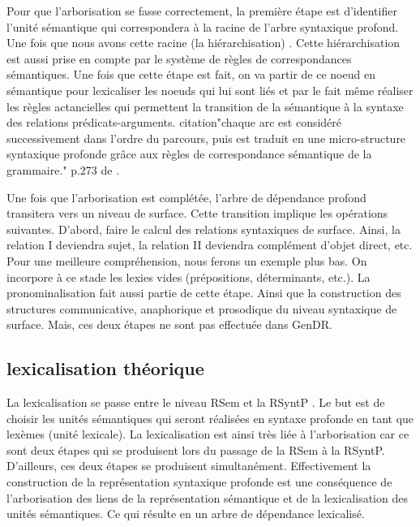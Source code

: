 Pour que l'arborisation se fasse correctement, la première étape est d'identifier l'unité sémantique qui correspondera à la racine de l'arbre syntaxique profond. Une fois que nous avons cette racine (la hiérarchisation) \citep{PolguereStructurationmisejeu1990}. Cette hiérarchisation est aussi prise en compte par le système de règles de correspondances sémantiques. Une fois que cette étape est fait, on va partir de ce noeud en sémantique pour lexicaliser les noeuds qui lui sont liés et par le fait même réaliser les règles actancielles qui permettent la transition de la sémantique à la syntaxe des relations prédicats-arguments. citation"chaque arc est considéré successivement dans l'ordre du parcours, puis est traduit en une micro-structure syntaxique profonde grâce aux règles de correspondance sémantique de la grammaire." p.273 de \citep{PolguereStructurationmisejeu1990}. 



Une fois que l'arborisation est complétée, l'arbre de dépendance profond transitera vers un niveau de surface. Cette transition implique les opérations suivantes. D'abord, faire le calcul des relations syntaxiques de surface. Ainsi, la relation I deviendra sujet, la relation II deviendra complément d'objet direct, etc. Pour une meilleure compréhension, nous ferons un exemple plus bas. On incorpore à ce stade les lexies vides (prépositions, déterminants, etc.). La pronominalisation fait aussi partie de cette étape. Ainsi que la construction des structures communicative, anaphorique et prosodique du niveau syntaxique de surface. Mais, ces deux étapes ne sont pas effectuée dans GenDR.

\subsection{lexicalisation théorique}

La lexicalisation se passe entre le niveau RSem et la RSyntP \citep{PolguereStructurationmisejeu1990}. Le but est de choisir les unités sémantiques qui seront réalisées en syntaxe profonde en tant que lexèmes (unité lexicale). La lexicalisation est ainsi très liée à l'arborisation car ce sont deux étapes qui se produisent lors du passage de la RSem à la RSyntP. D'ailleurs, ces deux étapes se produisent simultanément. Effectivement la construction de la représentation syntaxique profonde est une conséquence de l'arborisation des liens de la représentation sémantique et de la lexicalisation des unités sémantiques. Ce qui résulte en un arbre de dépendance lexicalisé.

